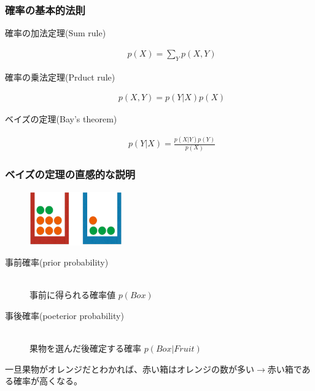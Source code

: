 \documentclass[dvipdfmx]{beamer}
\theoremstyle{definition}
\begin{document}
\begin{frame}
  \frametitle{確率の基本的法則}
  \begin{description}
    \item[確率の加法定理(Sum rule)]
      \begin{gather*}
        p(X)=\sum_{Y} p(X,Y)
      \end{gather*}
    \item[確率の乗法定理(Prduct rule)]
      \begin{gather*}
        p(X,Y)=p(Y|X)p(X)
      \end{gather*}
    \item[ベイズの定理(Bay's theorem)]
      \begin{gather*}
        p(Y|X) = \frac{p(X|Y)p(Y)}{p(X)}
      \end{gather*}
  \end{description}
\end{frame}
\begin{frame}
  \frametitle{ベイズの定理の直感的な説明}
    \begin{figure}[htb]
      \centering
      \includegraphics[width=4.0cm,clip]{res/probability.eps}
    \end{figure}
  \begin{description}
    \item[事前確率(prior probability)] \hfill \\
      事前に得られる確率値 $p(Box)$
    \item[事後確率(poeterior probability)] \hfill \\
      果物を選んだ後確定する確率 $p(Box|Fruit)$
  \end{description}
  一旦果物がオレンジだとわかれば、赤い箱はオレンジの数が多い$\to$赤い箱である確率が高くなる。
\end{frame}
\begin{frame}
  \frametitle{}
\end{frame}
\begin{frame}
  \frametitle{}
\end{frame}
\begin{frame}
  \frametitle{}
\end{frame}
\begin{frame}
  \frametitle{}
\end{frame}
\begin{frame}
  \frametitle{}
\end{frame}
\end{document}
